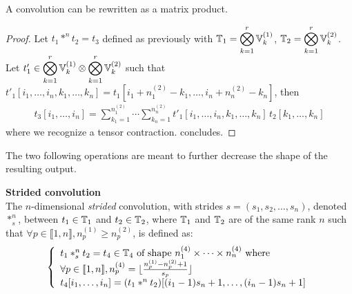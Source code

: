 \begin{proposition}%
A convolution can be rewritten as a matrix product.
\label{prop:matprodeq2}
\end{proposition}

\begin{proof}
Let $t_1 \ast^n t_2 = t_3$ defined as previously with $\mathbb{T}_1 = \displaystyle \bigotimes_{k=1}^r \mathbb{V}_k^{(1)}$, $\mathbb{T}_2 = \displaystyle \bigotimes_{k=1}^r \mathbb{V}_k^{(2)}$. Let $t'_1 \in \displaystyle \bigotimes_{k=1}^r \mathbb{V}_k^{(1)} \otimes \displaystyle \bigotimes_{k=1}^r \mathbb{V}_k^{(2)}$ such that $t'_1[i_1, \ldots, i_n, k_1, \ldots, k_n] = t_1[i_1 + n_1^{(2)} - k_1, \ldots, i_n + n_n^{(2)} - k_n]$, then
\begin{gather*}
t_3[i_1, \ldots, i_n] =
    \displaystyle \sum_{k_1=1}^{n_1^{(2)}} \cdots \sum_{k_n=1}^{n_n^{(2)}}
    t'_1[i_1, \ldots, i_n, k_1, \ldots, k_n] \hspace{2pt} t_2[k_1, \ldots, k_n]
\end{gather*}
where we recognize a tensor contraction.  concludes.
\end{proof}

The two following operations are meant to further decrease the shape of the resulting output.

\begin{definition}\textbf{Strided convolution}\\
The $n$-dimensional \emph{strided} convolution, with strides $s = (s_1, s_2, \ldots, s_n)$, denoted $\ast^n_s$, between $t_1 \in \mathbb{T}_1$ and $t_2 \in \mathbb{T}_2$, where $\mathbb{T}_1$ and $\mathbb{T}_2$ are of the same rank $n$ such that $\forall p \in \llbracket 1, n \rrbracket, n_p^{(1)} \ge n_p^{(2)}$, is defined as:
\begin{gather*}
\left\{
  \begin{array}{l}
    t_1 \ast^n_s t_2 = t_4 \in  \mathbb{T}_4 \text{ of shape } n_1^{(4)} \times \cdots \times n_n^{(4)}
    \text{ where} \\
    \forall p \in \llbracket 1, n \rrbracket, n_p^{(4)} = \lfloor\frac{n_p^{(1)} - n_p^{(2)} + 1}{s_p}\rfloor \\
    t_4[i_1, \ldots, i_n] = (t_1 \ast^n t_2)[(i_1 - 1)s_n + 1, \ldots, (i_n - 1)s_n + 1]\\
  \end{array}
\right.
\end{gather*}
\end{definition}

